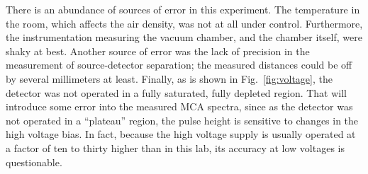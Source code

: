 \documentclass{anstrans}
\begin{document}
There is an abundance of sources of error in this experiment. The temperature
in the
room, which affects the air density, was not at all under control. Furthermore,
the instrumentation measuring the vacuum chamber, and the chamber itself,
were shaky at best. Another source of error was the lack of precision in the
measurement of source-detector separation; the measured distances could be off
by several millimeters at least. Finally, as is shown in
Fig.~\ref{fig:voltage}, the detector was not operated in a fully saturated,
fully depleted region. That will introduce some error into the measured MCA
spectra, since as the detector was not operated in a ``plateau'' region, the
pulse height is sensitive to changes in the high voltage bias. In fact, because
the high voltage supply is usually operated at a factor of ten to thirty higher
than in this lab, its accuracy at low voltages is questionable.
\nocite{kno2000}


\end{document}
